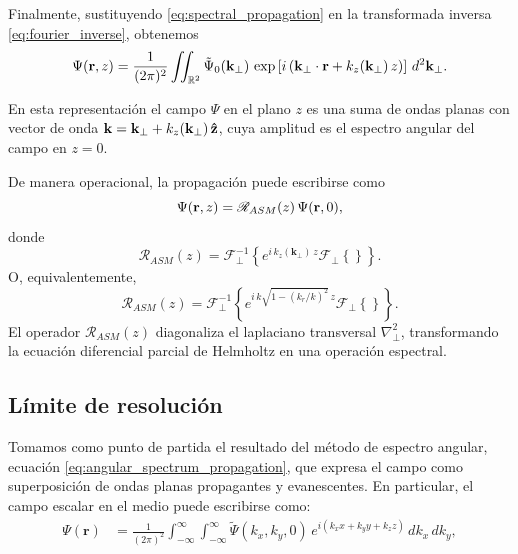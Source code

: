 \documentclass[12pt,a4paper]{article}
\numberwithin{equation}{section}
\newcommand{\uvec}[1]{\bm{\hat{\mathbf{#1}}}}
\begin{document}
Finalmente, sustituyendo \eqref{eq:spectral_propagation} en la transformada inversa \eqref{eq:fourier_inverse}, obtenemos
\begin{equation}
\Psi(\vb r,z)
=
\frac{1}{(2\pi)^2}
\iint_{\mathbb R^2}
\tilde{\Psi}_0(\mathbf k_\perp)\,
\exp
\left[
i\left(
\mathbf k_\perp\cdot\vb r
+
k_z(\mathbf k_\perp)\,z
\right)
\right]
\,d^2\mathbf k_\perp.
\label{eq:angular_spectrum_propagation}
\end{equation}

En esta representación el campo $\Psi$ en el plano $z$ es una suma de ondas planas con vector de onda $\vb k = \vb k_\perp + k_z(\vb k_\perp)\,\uvec z$, cuya amplitud es el espectro angular del campo en $z=0$.

De manera operacional, la propagación puede escribirse como
\begin{equation}
\Psi(\vb r,z)
=
\mathscr R_{ASM}(z)\,
\Psi(\vb r,0),
\label{eq:operator_form}
\end{equation}
donde
\begin{equation}
\mathscr R_{ASM}(z)
=
\mathscr F_\perp^{-1}
\left\{
e^{i\,k_z(\mathbf k_\perp)\,z}
\mathscr F_\perp \left\{ \right\} \right\}.
\label{eq:propagation_operator}
\end{equation}
O, equivalentemente,
\begin{equation}
\mathscr R_{ASM}(z)
=
\mathscr F_\perp^{-1}
\left\{
  e^{i\, k \sqrt{1 - (k_r/k)^2 }  \,z}
\mathscr F_\perp \left\{ \right\} \right\}.
\label{eq:propagation_operator_explicit}
\end{equation}
El operador $\mathscr R_{ASM}(z)$ diagonaliza el laplaciano transversal $\nabla_\perp^2$, transformando la ecuación diferencial parcial de Helmholtz en una operación espectral.








\subsection{Límite de resolución} 
\label{sec:resolution_limit}

Tomamos como punto de partida el resultado del método de espectro angular, ecuación \eqref{eq:angular_spectrum_propagation}, que expresa el campo como superposición de ondas planas propagantes y evanescentes. En particular, el campo escalar en el medio puede escribirse como:
\begin{equation}
\begin{aligned}
\Psi(\mathbf r)
&= \frac{1}{(2\pi)^2}
\int_{-\infty}^{\infty}\!\!\int_{-\infty}^{\infty}
\tilde\Psi(k_x,k_y,0)\,
e^{i(k_x x + k_y y + k_z z)}\, dk_x\,dk_y,
\end{aligned}
\end{equation}
\end{document}
